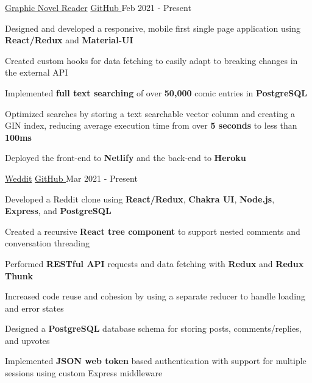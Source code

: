 
\begin{cventries}
  \cventry
    {\fontsize{10pt}{1em}\bodyfont\upshape{}} %
    {\href{https://mangastack.cf/}{Graphic Novel Reader}} %
    {\href{https://github.com/tacticaltofu/mangastack}{GitHub \faExternalLink}} %
    {Feb 2021 - Present} %
    {
      \begin{cvitems} %
        \item {Designed and developed a responsive, mobile first single page application using \textbf{React/Redux} and \textbf{Material-UI}}
        \item {Created custom hooks for data fetching to easily adapt to breaking changes in the external API}
        \item {Implemented \textbf{full text searching} of over \textbf{50,000} comic entries in \textbf{PostgreSQL}}
        \item {Optimized searches by storing a text searchable vector column and creating a GIN index, reducing average execution time from over \textbf{5 seconds} to less than \textbf{100ms}}
        \item {Deployed the front-end to \textbf{Netlify} and the back-end to \textbf{Heroku}}
      \end{cvitems}
    }
    
  \cventry
    {\fontsize{10pt}{1em}\bodyfont\upshape{}} %
    {\href{https://weddit.netlify.app/}{Weddit}} %
    {\href{https://github.com/tacticaltofu/reddit-clone}{GitHub \faExternalLink}} %
    {Mar 2021 - Present} %
    {
      \begin{cvitems} %
        \item {Developed a Reddit clone using \textbf{React/Redux}, \textbf{Chakra UI}, \textbf{Node.js}, \textbf{Express}, and \textbf{PostgreSQL}}
        \item {Created a recursive \textbf{React tree component} to support nested comments and conversation threading}
        \item {Performed \textbf{RESTful API} requests and data fetching with \textbf{Redux} and \textbf{Redux Thunk}}
        \item {Increased code reuse and cohesion by using a separate reducer to handle loading and error states}
        \item {Designed a \textbf{PostgreSQL} database schema for storing posts, comments/replies, and upvotes}
        \item {Implemented \textbf{JSON web token} based authentication with support for multiple sessions using custom Express middleware}
      \end{cvitems}
    }
\end{cventries}